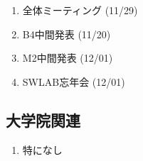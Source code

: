 \documentclass[fleqn, 14pt]{extarticle}
\begin{document}
    \begin{enumerate}

        \item 全体ミーティング
            \hfill
            \label{enum-18}
            (11/29)

        \item B4中間発表
            \hfill
            \label{enum-18}
            (11/20)

        \item M2中間発表
            \hfill
            \label{enum-18}
            (12/01)

        \item SWLAB忘年会
            \hfill
            \label{enum-18}
            (12/01)

    \end{enumerate}

    \subsection{大学院関連}
    \begin{enumerate}

        \item 特になし
            \hfill
            \label{enum-17}

    \end{enumerate}

    
\end{document}
